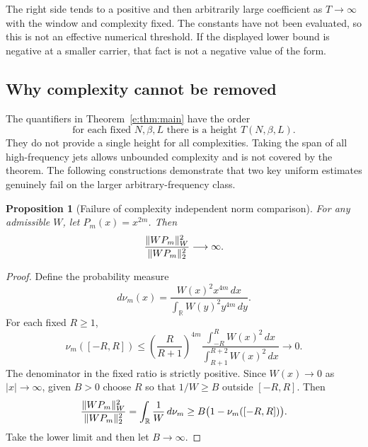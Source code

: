\documentclass[11pt,a4paper]{article}
\numberwithin{equation}{section}
\newtheorem{proposition}[theorem]{Proposition}
\theoremstyle{definition}\newtheorem{definition}[theorem]{Definition}
\theoremstyle{remark}\newtheorem{remark}[theorem]{Remark}
\newcommand{\R}{\mathbb R}\newcommand{\C}{\mathbb C}\newcommand{\N}{\mathbb N}
\begin{document}
The right side tends to a positive and then arbitrarily large coefficient
as $T\to\infty$ with the window and complexity fixed. The constants have
not been evaluated, so this is not an effective numerical threshold.
If the displayed lower bound is negative at a smaller carrier, that fact
is not a negative value of the form.

\subsection{Why complexity cannot be removed}\label{e:sec:limits}

The quantifiers in Theorem~\ref{e:thm:main} have the order
\[
 \text{for each fixed }N,\beta,L\text{ there is a height }T(N,\beta,L).
\]
They do not provide a single height for all complexities. Taking the span
of all high-frequency jets allows unbounded complexity and is not covered
by the theorem. The following constructions demonstrate that two key
uniform estimates genuinely fail on the larger arbitrary-frequency class.

\begin{proposition}[Failure of complexity independent norm comparison]\label{e:prop:norm-counter}
For any admissible $W$, let $P_m(x)=x^{2m}$. Then
\begin{equation}\label{e:eq:norm-counter}
 \frac{\lVert WP_m\rVert_W^2}{\lVert WP_m\rVert_2^2}\longrightarrow\infty.
\end{equation}
\end{proposition}
\begin{proof}
Define the probability measure
\[
 d\nu_m(x)=\frac{W(x)^2x^{4m}\,dx}{\int_\R W(y)^2y^{4m}\,dy}.
\]
For each fixed $R\ge1$,
\[
 \nu_m([-R,R])\le
 \left(\frac R{R+1}\right)^{4m}
 \frac{\int_{-R}^R W(x)^2\,dx}{\int_{R+1}^{R+2}W(x)^2\,dx}
 \longrightarrow0.
\]
The denominator in the fixed ratio is strictly positive. Since
$W(x)\to0$ as $|x|\to\infty$, given $B>0$ choose $R$ so that
$1/W\ge B$ outside $[-R,R]$. Then
\[
 \frac{\norm{WP_m}_W^2}{\norm{WP_m}_2^2}
 =\int_\R\frac1W\,d\nu_m
 \ge B\bigl(1-\nu_m([-R,R])\bigr).
\]
Take the lower limit and then let $B\to\infty$.
\end{proof}
\end{document}

